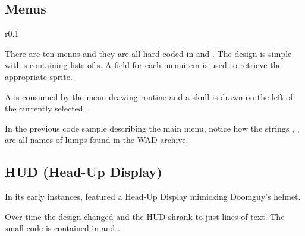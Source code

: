 \subsection{Menus}

\begin{wrapfigure}[5]{r}{0.1\textwidth}
\centering
{}
\end{wrapfigure}
There are ten menus and they are all hard-coded in  and . The design is simple with s containing lists of s. A  field for each menuitem is used to retrieve the appropriate sprite.\\
\par


\par
A  is consumed by the menu drawing routine and a skull is drawn on the left of the currently selected .\\
\par
\begin{minipage}{0.55\textwidth}
\end{minipage}
\begin{minipage}{0.45\textwidth}
\centering
{}
\end{minipage}
\par
{}
\par
In the previous code sample describing the main menu, notice how the strings , ,  are all names of lumps found in the WAD archive.\\
\par








\subsection{HUD (Head-Up Display)}
In its early instances, \doom{} featured a Head-Up Display mimicking Doomguy's helmet.\\
\par
{}
\par
Over time the design changed and the HUD shrank to just lines of text. The small code is contained in  and .\\
\par
{}\\
\par



